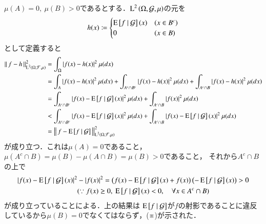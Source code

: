 \begin{prf}
\begin{description}
				$\mu(A) = 0,\ \mu(B) > 0$であるとする．$\operatorname{L}^{2} \left(\Omega, \mathcal{G},\mu\right)$の元を
				\begin{align}
					h(x) \coloneqq
					\begin{cases}
						\operatorname{E} \left[ f \ \middle|\ \mathcal{G} \right](x) & (x \in B^c) \\
						0 & (x \in B)
					\end{cases}
				\end{align}
				として定義すると
				\begin{align}
					\Norm{f - h}{\Lp{2}{\Omega, \mathcal{F},\mu}}^2 &= \int_{\Omega} |f(x) - h(x)|^2\ \mu(dx) \\
					&= \int_{A} |f(x) - h(x)|^2\ \mu(dx) + \int_{A^c \cap B^c} |f(x) - h(x)|^2\ \mu(dx) + \int_{A^c \cap B} |f(x) - h(x)|^2\ \mu(dx) \\
					&= \int_{A^c \cap B^c} |f(x) - \cexp{f}{\mathcal{G}}(x)|^2\ \mu(dx) + \int_{A^c \cap B} |f(x)|^2\ \mu(dx) \\
					&< \int_{A^c \cap B^c} |f(x) - \cexp{f}{\mathcal{G}}(x)|^2\ \mu(dx) + \int_{A^c \cap B} |f(x) - \cexp{f}{\mathcal{G}}(x)|^2\ \mu(dx) \\
					&= \Norm{f - \cexp{f}{\mathcal{G}}}{\Lp{2}{\Omega, \mathcal{F},\mu}}^2
				\end{align}
				が成り立つ．これは$\mu(A) = 0$であること，$\mu(A^c \cap B) = \mu(B) - \mu(A \cap B) = \mu(B) > 0$であること，
				それから$A^c \cap B$の上で
				\begin{align}
					|f(x) - \cexp{f}{\mathcal{G}}(x)|^2 &- |f(x)|^2 = \left(f(x) - \cexp{f}{\mathcal{G}}(x) + f(x)\right)\left(- \cexp{f}{\mathcal{G}}(x)\right) > 0 \\
					&(\because f(x) \geq 0,\ \cexp{f}{\mathcal{G}}(x) < 0, \quad \forall x \in A^c \cap B)
				\end{align}
				が成り立っていることによる．上の結果は
				$\operatorname{E} \left[ f \ \middle|\ \mathcal{G} \right]$が$f$の射影であることに違反しているから$\mu(B) = 0$でなくてはならず，(※)が示された．
				\QED
		\end{description}
	\end{prf}